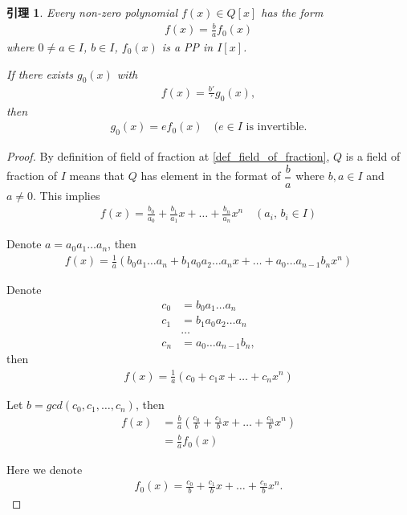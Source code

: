 \documentclass[utf8]{ctexbook}
\newtheorem{lemma}{引理}[section]
\begin{document}
\begin{lemma}
\label{lemma_Factor_poly_ring_2}
Every non-zero polynomial $f(x) \in Q[x]$ has the form
\begin{align}
f(x) = \frac{b}{a} f_0 (x)
\end{align}
where $0 \neq a \in I$, $b \in I$, $f_0 (x)$ is a PP in $I[x]$.

If there exists $g_0 (x)$ with
\begin{align*}
f(x) = \frac{b'}{'} g_0 (x),
\end{align*}
then
\begin{align*}
g_0 (x) = e f_0 (x) \quad (e \in I \mbox{ is invertible} .
\end{align*}
\end{lemma}

\begin{proof}
By definition of field of fraction at \ref{def_field_of_fraction}, $Q$ is a field of fraction of $I$ means that $Q$ has element in the format of $\dfrac{b}{a}$ where $b, a \in I$ and $a \neq 0$. This implies
\begin{align*}
f(x) = \frac{b_0}{a_0} + \frac{b_1}{a_1} x + \ldots + \frac{b_n}{a_n} x^n \quad (a_i, \, b_i \in I)
\end{align*}

Denote $a = a_0 a_1 \ldots a_n$, then
\begin{align*}
f(x) = \frac{1}{a} (b_0 a_1 \ldots a_n + b_1 a_0 a_2 \ldots a_n x + \ldots + a_0 \ldots a_{n-1} b_n x^n)
\end{align*}

Denote
\begin{align*}
c_0 &= b_0 a_1 \ldots a_n\\
c_1 &= b_1 a_0 a_2 \ldots a_n \\
& \ldots \\
c_n &= a_0 \ldots a_{n-1} b_n ,
\end{align*}
then
\begin{align*}
f(x) = \frac{1}{a} (c_0 + c_1 x + \ldots + c_n x^n )
\end{align*}

Let $b = gcd(c_0, c_1, \ldots , c_n)$, then
\begin{align*}
f(x) &= \frac{b}{a} ( \frac{c_0}{b} + \frac{c_1}{b} x + \ldots + \frac{c_n}{b} x^n )\\
&= \frac{b}{a} f_0 (x)
\end{align*}

Here we denote
\begin{align*}
f_0 (x) = \frac{c_0}{b} + \frac{c_1}{b} x + \ldots + \frac{c_n}{b} x^n .
\end{align*}


\end{proof}
\end{document}

